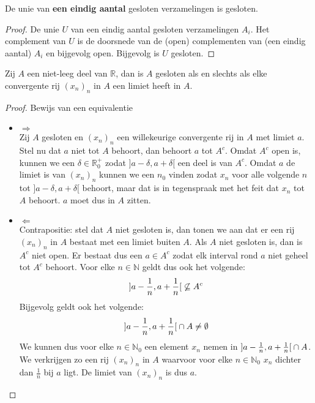 \documentclass[main.tex]{subfiles}
\begin{document}
\begin{bpr}
  \label{pr:eindige-unie-gesloten-verzamelingen-gesloten}
  De unie van \textbf{een eindig aantal} gesloten verzamelingen is gesloten.

  \begin{proof}
    De unie $U$ van een eindig aantal gesloten verzamelingen $A_{i}$.
    Het complement van $U$ is de doorsnede van de (open) complementen van (een eindig aantal) $A_{i}$ en bijgevolg open.
    Bijgevolg is $U$ gesloten.
  \end{proof}
\end{bpr}

\begin{bpr}
  \label{pr:gesloten-asa-elke-convergente-rij-in-A-limiet-in-A}
  Zij $A$ een niet-leeg deel van $\mathbb{R}$, dan is $A$ gesloten als en slechts als elke convergente rij $(x_{n})_{n}$ in $A$ een limiet heeft in $A$.

  \begin{proof}
    Bewijs van een equivalentie\\
    \begin{itemize}
    \item $\Rightarrow$\\
      Zij $A$ gesloten en $(x_{n})_{n}$ een willekeurige convergente rij in $A$ met limiet $a$.
      Stel nu dat $a$ niet tot $A$ behoort, dan behoort $a$ tot $A^{c}$.
      Omdat $A^{c}$ open is, kunnen we een $\delta \in \mathbb{R}_{0}^{+}$ zodat $]a-\delta,a+\delta[$ een deel is van $A^{c}$.
      Omdat $a$ de limiet is van $(x_{n})_{n}$ kunnen we een $n_{0}$ vinden zodat $x_{n}$ voor alle volgende $n$ tot $]a-\delta,a+\delta[$ behoort, maar dat is in tegenspraak met het feit dat $x_{n}$ tot $A$ behoort.
      $a$ moet dus in $A$ zitten.
    \item $\Leftarrow$\\
      Contrapositie: stel dat $A$ niet gesloten is, dan tonen we aan dat er een rij $(x_{n})_{n}$ in $A$ bestaat met een limiet buiten $A$.
      Als $A$ niet gesloten is, dan is $A^{c}$ niet open.
      Er bestaat dus een $a\in A^{c}$ zodat elk interval rond $a$ niet geheel tot $A^{c}$ behoort.
      Voor elke $n \in \mathbb{N}$ geldt dus ook het volgende:
      \[ \interval[open]{a-\frac{1}{n}}{a+\frac{1}{n}} \not \subseteq A^{c} \]
      Bijgevolg geldt ook het volgende:
      \[ \interval[open]{a-\frac{1}{n}}{a+\frac{1}{n}} \cap A \neq \emptyset \]
      We kunnen dus voor elke $n\in \mathbb{N}_{0}$ een element $x_{n}$ nemen in $\interval[open]{a-\frac{1}{n}}{a+\frac{1}{n}} \cap A$.
      We verkrijgen zo een rij $(x_{n})_{n}$ in $A$ waarvoor voor elke $n\in \mathbb{N}_{0}$ $x_{n}$ dichter dan $\frac{1}{n}$ bij $a$ ligt.
      De limiet van $(x_{n})_{n}$ is dus $a$.
    \end{itemize}
  \end{proof}
\end{bpr}
\end{document}
